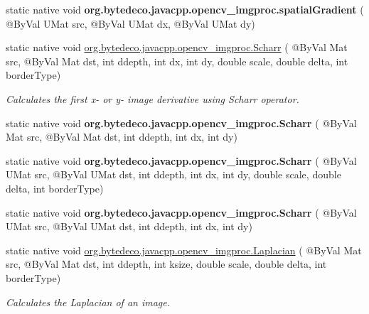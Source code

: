 \begin{DoxyCompactItemize}
\item 
\mbox{\label{group__imgproc__filter_ga87516c2f840e0444c4284be8c686971d}} 
static native void {\bfseries org.\+bytedeco.\+javacpp.\+opencv\+\_\+imgproc.\+spatial\+Gradient} ( @By\+Val U\+Mat src, @By\+Val U\+Mat dx, @By\+Val U\+Mat dy)
\item 
static native void \hyperlink{group__imgproc__filter_gabd4c276a8055604be5e13e061eee74a1}{org.\+bytedeco.\+javacpp.\+opencv\+\_\+imgproc.\+Scharr} ( @By\+Val Mat src, @By\+Val Mat dst, int ddepth, int dx, int dy, double scale, double delta, int border\+Type)
\begin{DoxyCompactList}\small\item\em Calculates the first x-\/ or y-\/ image derivative using Scharr operator. \end{DoxyCompactList}\item 
\mbox{\label{group__imgproc__filter_gaf8b36fd326b781bdfbe1b71222cddc76}} 
static native void {\bfseries org.\+bytedeco.\+javacpp.\+opencv\+\_\+imgproc.\+Scharr} ( @By\+Val Mat src, @By\+Val Mat dst, int ddepth, int dx, int dy)
\item 
\mbox{\label{group__imgproc__filter_gae9f59b1abc18c3bce3619ff427aa27fd}} 
static native void {\bfseries org.\+bytedeco.\+javacpp.\+opencv\+\_\+imgproc.\+Scharr} ( @By\+Val U\+Mat src, @By\+Val U\+Mat dst, int ddepth, int dx, int dy, double scale, double delta, int border\+Type)
\item 
\mbox{\label{group__imgproc__filter_ga8aa42854b5ace626e6e40c3d80921e27}} 
static native void {\bfseries org.\+bytedeco.\+javacpp.\+opencv\+\_\+imgproc.\+Scharr} ( @By\+Val U\+Mat src, @By\+Val U\+Mat dst, int ddepth, int dx, int dy)
\item 
static native void \hyperlink{group__imgproc__filter_ga223106fa434e6e5dee1974eab81bbf26}{org.\+bytedeco.\+javacpp.\+opencv\+\_\+imgproc.\+Laplacian} ( @By\+Val Mat src, @By\+Val Mat dst, int ddepth, int ksize, double scale, double delta, int border\+Type)
\begin{DoxyCompactList}\small\item\em Calculates the Laplacian of an image. \end{DoxyCompactList}\item 
\mbox{\label{group__imgproc__filter_gabbed757ee3966f8466a886e2eab4abbb}} 

\end{DoxyCompactItemize}
